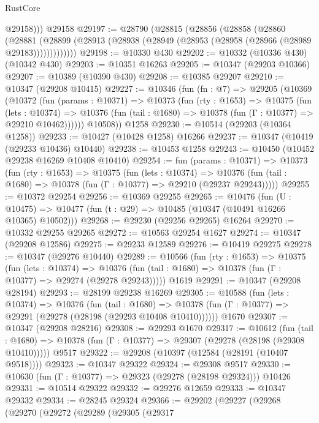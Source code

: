 \begin{lexlean}{RustCore}
\begin{coremodule}
          @29158)))
    @29158
@29197 := @28790
    (@28815
      (@28856
        (@28858
          (@28860
            (@28881
              (@28899 (@28913 (@28938 (@28949 (@28953 (@28958 (@28966 (@28989 @29183)))))))))))))
@29198 := @10330 @430
@29202 := @10332 (@10336 @430) (@10342 @430)
@29203 := @10351 @16263
@29205 := @10347 (@29203 @10366)
@29207 := @10389 (@10390 @430)
@29208 := @10385 @29207
@29210 := @10347 (@29208 @10415)
@29227 := @10346
    (fun (fn : @7) =>
    @29205
      (@10369
        (@10372
          (fun (params : @10371) =>
          @10373
            (fun (rty : @1653) =>
            @10375
              (fun (lets : @10374) =>
              @10376 (fun (tail : @1680) => @10378 (fun (Γ : @10377) => @29210 @10462))))))
        @10508))
    @1258
@29230 := @10514 (@29203 (@10364 @1258))
@29233 := @10427 (@10428 @1258) @16266
@29237 := @10347 (@10419 (@29233 @10436) @10440)
@29238 := @10453 @1258
@29243 := @10450 (@10452 @29238 @16269 @10408 @10410)
@29254 := fun (params : @10371) =>
  @10373
    (fun (rty : @1653) =>
    @10375
      (fun (lets : @10374) =>
      @10376 (fun (tail : @1680) => @10378 (fun (Γ : @10377) => @29210 (@29237 @29243)))))
@29255 := @10372 @29254
@29256 := @10369 @29255
@29265 := @10476
    (fun (U : @10475) => @10477 (fun (t : @29) => @10485 (@10347 (@10491 @16266 @10365) @10502)))
@29268 := @29230 (@29256 @29265) @16264
@29270 := @10332 @29255 @29265
@29272 := @10563 @29254 @1627
@29274 := @10347 (@29208 @12586)
@29275 := @29233 @12589
@29276 := @10419 @29275
@29278 := @10347 (@29276 @10440)
@29289 := @10566
    (fun (rty : @1653) =>
    @10375
      (fun (lets : @10374) =>
      @10376 (fun (tail : @1680) => @10378 (fun (Γ : @10377) => @29274 (@29278 @29243)))))
    @1619
@29291 := @10347 (@29208 @28194)
@29293 := @28199 @29238 @16269
@29305 := @10588
    (fun (lets : @10374) =>
    @10376
      (fun (tail : @1680) =>
      @10378 (fun (Γ : @10377) => @29291 (@29278 (@28198 (@29293 @10408 @10410))))))
    @1670
@29307 := @10347 (@29208 @28216)
@29308 := @29293 @1670
@29317 := @10612
    (fun (tail : @1680) => @10378 (fun (Γ : @10377) => @29307 (@29278 (@28198 (@29308 @10410)))))
    @9517
@29322 := @29208 (@10397 (@12584 (@28191 (@10407 @9518))))
@29323 := @10347 @29322
@29324 := @29308 @9517
@29330 := @10630 (fun (Γ : @10377) => @29323 (@29278 (@28198 @29324))) @10426
@29331 := @10514 @29322
@29332 := @29276 @12659
@29333 := @10347 @29332
@29334 := @28245 @29324
@29366 := @29202
    (@29227
      (@29268
        (@29270
          (@29272
            (@29289
              (@29305
                (@29317

\end{coremodule}
\end{lexlean}
